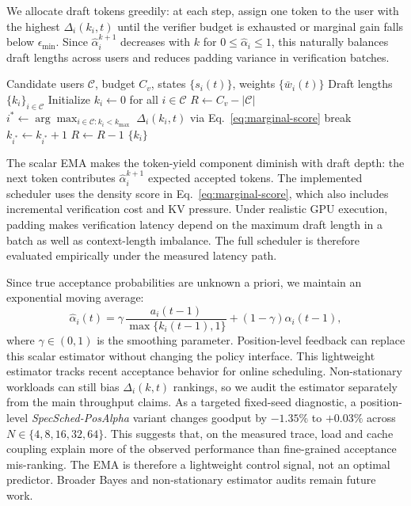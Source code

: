 \documentclass[journal]{IEEEtran}
\newcommand{\system}{SpecSched}
\begin{document}
We allocate draft tokens greedily: at each step, assign 
one token to the user with the highest $\Delta_i(k_i, t)$ 
until the verifier budget is exhausted or marginal gain 
falls below $\epsilon_{\min}$. Since 
$\hat{\alpha}_{i}^{k+1}$ decreases with $k$ for
$0\leq\hat{\alpha}_{i}\leq1$, this naturally balances draft
lengths across users and reduces padding variance in verification
batches.

\begin{algorithm}[t]
\caption{SLO-Aware Marginal Draft Allocation}
\label{alg:water-filling}
\begin{algorithmic}[1]
\REQUIRE Candidate users $\mathcal{C}$, budget $C_v$, 
         states $\{s_i(t)\}$, weights $\{\bar{w}_i(t)\}$
\ENSURE Draft lengths $\{k_i\}_{i \in \mathcal{C}}$
\STATE Initialize $k_i \leftarrow 0$ for all 
       $i \in \mathcal{C}$
\STATE $R \leftarrow C_v - |\mathcal{C}|$ 
    \STATE $i^* \leftarrow \arg\max_{i \in \mathcal{C}: k_i < k_{\max}} \; 
           \Delta_i(k_i, t)$ via Eq.~\eqref{eq:marginal-score}
        \STATE break
    \ENDIF
    \STATE $k_{i^*} \leftarrow k_{i^*} + 1$
    \STATE $R \leftarrow R - 1$
\ENDWHILE
\RETURN $\{k_i\}$
\end{algorithmic}
\end{algorithm}

The scalar EMA makes the token-yield component diminish with draft
depth: the next token contributes $\hat{\alpha}_i^{k+1}$ expected
accepted tokens. The implemented scheduler uses the density score in
Eq.~\eqref{eq:marginal-score}, which also includes incremental
verification cost and KV pressure. Under realistic GPU execution,
padding makes verification latency depend on the maximum draft length
in a batch as well as context-length imbalance. The full scheduler is
therefore evaluated empirically under the measured latency path.

Since true acceptance probabilities are unknown a priori, 
we maintain an exponential moving average:
\begin{equation}
    \label{eq:alpha-estimation}
    \hat{\alpha}_{i}(t) =
    \gamma\,\frac{a_i(t-1)}{\max\{k_i(t-1),1\}}
    +(1-\gamma)\hat{\alpha}_{i}(t-1),
\end{equation}
where $\gamma \in (0,1)$ is the smoothing parameter. Position-level
feedback can replace this scalar estimator without changing the
policy interface.
This lightweight estimator tracks recent acceptance behavior for
online scheduling. Non-stationary workloads can still bias
$\Delta_i(k,t)$ rankings, so we audit the estimator separately from
the main throughput claims. As a targeted fixed-seed diagnostic, a
position-level \textit{\system{}-PosAlpha} variant changes goodput by
$-1.35\%$ to $+0.03\%$ across $N\in\{4,8,16,32,64\}$. This suggests
that, on the measured trace, load and cache coupling explain more of
the observed performance than fine-grained acceptance mis-ranking.
The EMA is therefore a lightweight control signal, not an optimal
predictor. Broader Bayes and non-stationary estimator audits remain
future work.
\end{document}
